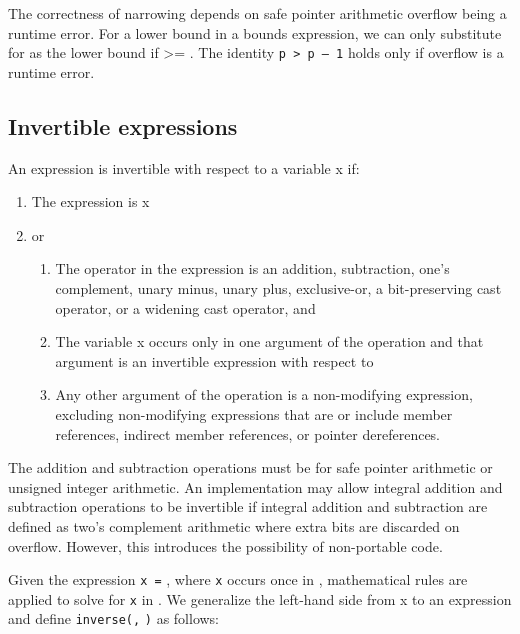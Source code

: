 The correctness of narrowing depends on safe pointer arithmetic overflow
being a runtime error. For a lower bound  in a bounds
expression, we can only substitute  for  as the lower
bound if  \textgreater{}= . The identity \texttt{p
\textgreater{} p -- 1} holds only if overflow is a runtime error.

\subsection{Invertible expressions}
An expression is invertible with respect to a variable x if:

\begin{enumerate}
\item
  The expression is x
\item
  or

  \begin{enumerate}
  \item
    The operator in the expression is an addition, subtraction, one's
    complement, unary minus, unary plus, exclusive-or, a bit-preserving
    cast operator, or a widening cast operator, and
  \item
    The variable x occurs only in one argument of the operation and that
    argument is an invertible expression with respect to 
  \item
    Any other argument of the operation is a non-modifying expression,
    excluding non-modifying expressions that are or include member
    references, indirect member references, or pointer dereferences.
  \end{enumerate}
\end{enumerate}

The addition and subtraction operations must be for safe pointer
arithmetic or unsigned integer arithmetic. An implementation may allow
integral addition and subtraction operations to be invertible if
integral addition and subtraction are defined as two's complement
arithmetic where extra bits are discarded on overflow. However, this
introduces the possibility of non-portable code.

Given the expression \texttt{x =} , where \texttt{x} occurs once
in , mathematical rules are applied to solve for \texttt{x} in
. We generalize the left-hand side from x to an expression
 and define \texttt{inverse(}\texttt{,}
\texttt{)} as follows:

